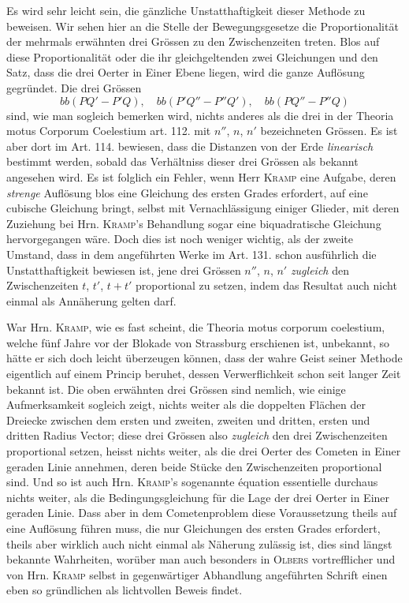 Es wird sehr leicht sein, die gänzliche Unstatthaftigkeit dieser Methode zu beweisen. Wir sehen hier an
die Stelle der Bewegungsgesetze die Proportionalität der mehrmals erwähnten drei Grössen zu den
Zwischenzeiten treten. Blos auf diese Proportionalität oder die ihr gleichgeltenden zwei Gleichungen und den Satz, dass die drei Oerter in Einer Ebene liegen, wird die ganze Auflösung gegründet. Die
drei Grössen
\[
bb(PQ'-P'Q), \quad bb(P'Q''-P''Q'), \quad bb(PQ''-P''Q)
\]
sind, wie man sogleich bemerken wird, nichts anderes als die drei in der Theoria motus Corporum Coelestium
art. 112. mit $n''$, $n$, $n'$ bezeichneten Grössen. Es ist aber dort im Art. 114. bewiesen, dass die
Distanzen von der Erde \emph{linearisch} bestimmt werden, sobald das Verhältniss dieser drei Grössen als
bekannt angesehen wird. Es ist folglich ein Fehler, wenn Herr \textsc{Kramp} eine Aufgabe, deren \emph{strenge}
Auflösung blos eine Gleichung des ersten Grades erfordert, auf eine cubische Gleichung bringt, selbst mit
Vernachlässigung einiger Glieder, mit deren Zuziehung bei Hrn. \textsc{Kramp}'s Behandlung sogar eine
biquadratische Gleichung hervorgegangen wäre. Doch dies ist noch weniger wichtig, als der zweite Umstand,
dass in dem angeführten Werke im Art. 131. schon ausführlich die Unstatthaftigkeit bewiesen ist, jene
drei Grössen $n''$, $n$, $n'$ \emph{zugleich} den Zwischenzeiten $t$, $t'$, $t+t'$ proportional zu setzen,
indem das Resultat auch nicht einmal als Annäherung gelten darf.

War Hrn. \textsc{Kramp}, wie es fast scheint, die Theoria motus corporum coelestium, welche fünf Jahre vor
der Blokade von Strassburg erschienen ist, unbekannt, so hätte er sich doch leicht überzeugen können,
dass der wahre Geist seiner Methode eigentlich auf einem Princip beruhet, dessen Verwerflichkeit schon seit
langer Zeit bekannt ist. Die oben erwähnten drei Grössen sind nemlich, wie einige Aufmerksamkeit sogleich
zeigt, nichts weiter als die doppelten Flächen der Dreiecke zwischen dem ersten und zweiten, zweiten und
dritten, ersten und dritten Radius Vector; diese drei Grössen also \emph{zugleich} den drei Zwischenzeiten
proportional setzen, heisst nichts weiter, als die drei Oerter des Cometen in Einer geraden Linie annehmen,
deren beide Stücke den Zwischenzeiten proportional sind. Und so ist auch Hrn. \textsc{Kramp}'s sogenannte
équation essentielle durchaus nichts weiter, als die Bedingungsgleichung für die Lage der drei Oerter in
Einer geraden Linie. Dass aber in dem Cometenproblem diese Voraussetzung theils auf eine Auflösung führen
muss, die nur Gleichungen des ersten Grades erfordert, theils aber wirklich auch nicht einmal als Näherung
zulässig ist, dies sind längst bekannte Wahrheiten, worüber man auch besonders in \textsc{Olbers}
vortrefflicher und von Hrn. \textsc{Kramp} selbst in gegenwärtiger Abhandlung angeführten Schrift einen
eben so gründlichen als lichtvollen Beweis findet.

